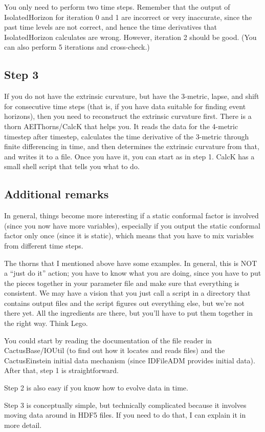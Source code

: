 You only need to perform two time steps.  Remember that the output of
IsolatedHorizon for iteration 0 and 1 are incorrect or very
inaccurate, since the past time levels are not correct, and hence the
time derivatives that IsolatedHorizon calculates are wrong.  However,
iteration 2 should be good.  (You can also perform 5 iterations and
cross-check.)



\subsection{Step 3}

If you do not have the extrinsic curvature, but have the 3-metric,
lapse, and shift for consecutive time steps (that is, if you have data
suitable for finding event horizons), then you need to reconstruct the
extrinsic curvature first.  There is a thorn AEIThorns/CalcK that
helps you.  It reads the data for the 4-metric timestep after
timestep, calculates the time derivative of the 3-metric through
finite differencing in time, and then determines the extrinsic
curvature from that, and writes it to a file.  Once you have it, you
can start as in step 1.  CalcK has a small shell script that tells you
what to do.



\subsection{Additional remarks}

In general, things become more interesting if a static conformal
factor is involved (since you now have more variables), especially if
you output the static conformal factor only once (since it is static),
which means that you have to mix variables from different time steps.

The thorns that I mentioned above have some examples.  In general,
this is NOT a ``just do it'' action; you have to know what you are
doing, since you have to put the pieces together in your parameter
file and make sure that everything is consistent.  We may have a
vision that you just call a script in a directory that contains output
files and the script figures out everything else, but we're not there
yet.  All the ingredients are there, but you'll have to put them
together in the right way.  Think Lego.

You could start by reading the documentation of the file reader in
CactusBase/IOUtil (to find out how it locates and reads files) and the
CactusEinstein initial data mechanism (since IDFileADM provides
initial data).  After that, step 1 is straightforward.

Step 2 is also easy if you know how to evolve data in time.

Step 3 is conceptually simple, but technically complicated because it
involves moving data around in HDF5 files.  If you need to do that, I
can explain it in more detail.
